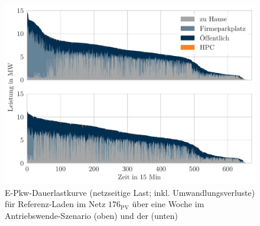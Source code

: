 \begin{figure}[H]
    \centering
    \includegraphics[width=\textwidth]{Bilder/example_load_duration_curve}
    \caption[E-Pkw-Dauerlastkurve für Referenz-Laden im Netz \num{176} über eine Woche im Antriebswende-Szenario und der \SzeFirmenparkplatz]{E-Pkw-Dauerlastkurve (netzseitige Last; inkl. Umwandlungsverluste) für Referenz-Laden im Netz \(176_{\text{PV}}\) über eine Woche im Antriebswende-Szenario (oben) und der \SzeFirmenparkplatz (unten)}\label{fig:example_load_curve}
\end{figure}